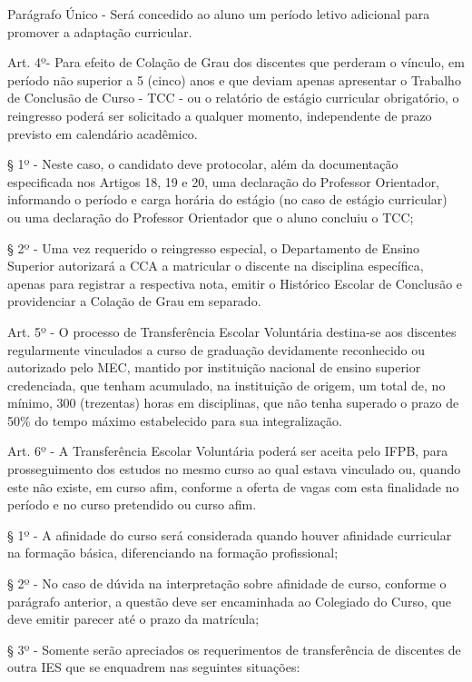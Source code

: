 Parágrafo Único - Será concedido ao aluno um período letivo adicional para promover a adaptação curricular.

\vspace{1mm}
Art. 4º- Para efeito de Colação de Grau dos discentes que perderam o vínculo, em período não superior a 5 (cinco) anos e que deviam apenas apresentar o Trabalho de Conclusão de Curso - TCC - ou o relatório de estágio curricular obrigatório, o reingresso poderá ser solicitado a qualquer momento, independente de prazo previsto em calendário acadêmico.

	§ 1º - Neste caso, o candidato deve protocolar, além da documentação especificada nos Artigos 18, 19 e 20, uma declaração do Professor Orientador, informando o período e carga horária do estágio (no caso de estágio curricular) ou uma declaração do Professor Orientador que o aluno concluiu o TCC;

	§ 2º - Uma vez requerido o reingresso especial, o Departamento de Ensino Superior autorizará a CCA a matricular o discente na disciplina específica, apenas para registrar a respectiva nota, emitir o Histórico Escolar de Conclusão e providenciar a Colação de Grau em separado.

\vspace{1mm}
Art. 5º - O processo de Transferência Escolar Voluntária destina-se aos discentes regularmente vinculados a curso de graduação devidamente reconhecido ou autorizado pelo MEC, mantido por instituição nacional de ensino superior credenciada, que tenham acumulado, na instituição de origem, um total de, no mínimo, 300 (trezentas) horas em disciplinas, que não tenha superado o prazo de 50\% do tempo máximo estabelecido para sua integralização.

\vspace{1mm}
Art. 6º - A Transferência Escolar Voluntária poderá ser aceita pelo IFPB, para prosseguimento dos estudos no mesmo curso ao qual estava vinculado ou, quando este não existe, em curso afim, conforme a oferta de vagas com esta finalidade no período e no curso pretendido ou curso afim.

§ 1º - A afinidade do curso será considerada quando houver afinidade curricular na formação básica, diferenciando na formação profissional;

§ 2º - No caso de dúvida na interpretação sobre afinidade de curso, conforme o parágrafo anterior, a questão deve ser encaminhada ao Colegiado do Curso, que deve emitir parecer até o prazo da matrícula;

§ 3º - Somente serão apreciados os requerimentos de transferência de discentes de outra IES que se enquadrem nas seguintes situações:

